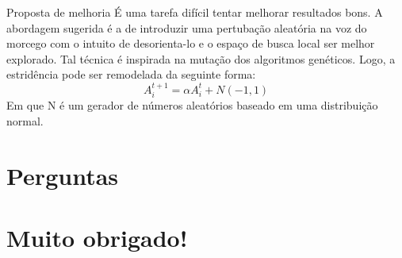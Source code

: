 \documentclass{beamer}
\begin{document}
  \begin{frame}{Proposta de melhoria}
      É uma tarefa difícil tentar melhorar resultados bons. A abordagem sugerida é a de introduzir uma pertubação aleatória na voz do morcego com o intuito de desorienta-lo e o espaço de busca local ser melhor explorado. Tal técnica é inspirada na mutação dos algoritmos genéticos. Logo, a estridência pode ser remodelada da seguinte forma:
      \begin{equation}
          A^{t+1}_i = \alpha A^{t}_i+N(-1,1)
      \end{equation}
      Em que N é um gerador de números aleatórios baseado em uma distribuição normal.
  \end{frame}


  \section{Perguntas}
  \section{Muito obrigado!}

  \begin{frame}
      
      
  \end{frame}
\end{document}
